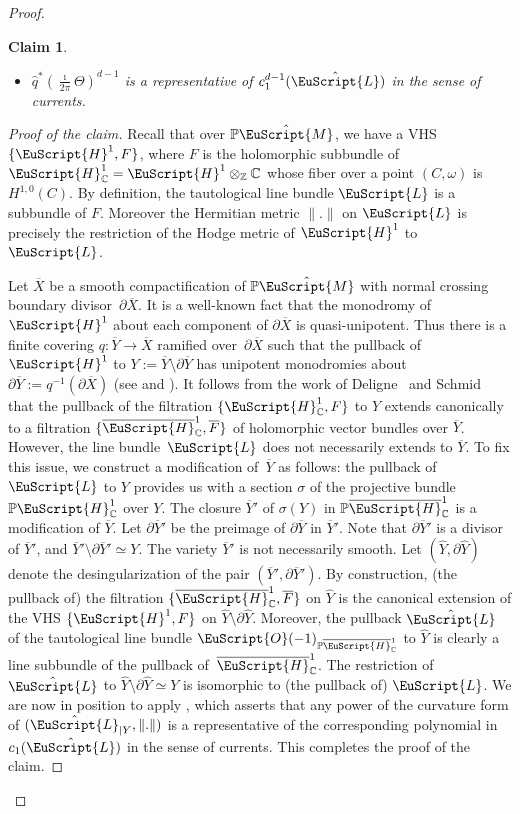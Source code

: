 \documentclass[JEP,XML,SOM,Unicode]{cedram}
\let\mathcal\EuScript
\theoremstyle{plain}
\newtheorem{Claim}[Theorem]{Claim}
\theoremstyle{definition}
\def\C{\mathbb{C}}
\newcommand\Z{\mathbb{Z}}
\newcommand{\Pb}{\mathbb{P}}
\newcommand{\Ocal}{\mathcal{O}}
\newcommand{\cH}{\mathcal{H}}
\newcommand{\cL}{\mathcal{L}}
\newcommand{\cM}{\mathcal{M}}
\let\omg\omega
\let\ol\overline
\begin{document}
\begin{proof}
\begin{Claim}
\begin{itemize}
\item $\hat{q}^*(\frac{\imath}{2\pi}\Theta)^{d-1}$ is a representative of $c^{d-1}_1(\hat{\cL})$ in the sense of currents.
\end{itemize}
\end{Claim}
\begin{proof}[Proof of the claim]
Recall that over $\Pb\hat{\cM}$, we have a VHS $\{\cH^1, F\}$, where $F$ is the holomorphic subbundle of $\cH^1_{\C}=\cH^1\otimes_{\Z}\C$ whose fiber over a point $(C,\omg)$ is $H^{1,0}(C)$. By definition, the tautological line bundle $\cL$ is a subbundle of $F$. Moreover the Hermitian metric $\|.\|$ on $\cL$ is precisely the restriction of the Hodge metric of $\cH^1$ to $\cL$.

Let $\ol{X}$ be a smooth compactification of $\Pb\hat{\cM}$ with normal crossing boundary divi\-sor~$\partial \ol{X}$. It is a well-known fact that the monodromy of $\cH^1$ about each component of $\partial \ol{X}$ is quasi-unipotent. Thus there is a finite covering $q: \ol{Y} \to \ol{X}$ ramified over~$\partial \ol{X}$ such that the pullback of $\cH^1$ to $Y:=\ol{Y}\setminus \partial\ol{Y}$ has unipotent monodromies about $\partial \ol{Y}:=q^{-1}(\partial \ol{X})$ (see \cite[Th.\,17]{Kaw81} and \cite[Lem.\,3.5]{Bru18}). It follows from the work of Deligne~\cite{Del70} and Schmid~\cite{Sch73} that the pullback of the filtration $\{\cH^1_{\C},F\}$ to $Y$ extends canonically to a filtration $\{\ol{\cH}^1_{\C}, \ol{F}\}$ of holomorphic vector bundles over $\ol{Y}$.
However, the line bundle~$\cL$ does not necessarily extends to $\ol{Y}$.
To fix this issue, we construct a modification of~$\ol{Y}$ as follows: the pullback of $\cL$ to $Y$ provides us with a section $\sigma$ of the projective bundle $\Pb\cH^1_{\C}$ over $Y$. The closure $\ol{Y}'$ of $\sigma(Y)$ in $\Pb\ol{\cH}^1_{\C}$ is a modification of $\ol{Y}$. Let $\partial \ol{Y}'$ be the preimage of $\partial \ol{Y}$ in $\ol{Y}'$. Note that $\partial\ol{Y}'$ is a divisor of $\ol{Y}'$, and $\ol{Y}'\setminus\partial\ol{Y}'\simeq Y$. The variety $\ol{Y}'$ is not necessarily smooth. Let $(\hat{Y},\partial\hat{Y})$ denote the desingularization of the pair $(\ol{Y}',\partial \ol{Y}')$. By construction, (the pullback of) the filtration $\{\ol{\cH}^1_{\C}, \ol{F}\}$ on $\hat{Y}$ is the canonical extension of the VHS $\{\cH^1,F\}$ on $\hat{Y}\setminus\partial\hat{Y}$. Moreover, the pullback $\hat{\cL}$ of the tautological line bundle $\Ocal(-1)_{\Pb\ol{\cH}^1_{\C}}$ to $\hat{Y}$ is clearly a line subbundle of the pullback of~$\ol{\cH}^1_{\C}$.
The restriction of $\hat{\cL}$ to $\hat{Y}\setminus\partial\hat{Y}\simeq Y$ is isomorphic to (the pullback of) $\cL$.
We are now in position to apply \cite[Th.\,5.1 and Remark 5.19]{Kollar87}, which asserts that any power of the curvature form of $(\hat{\cL}_{|Y}, \|.\|)$ is a representative of the corresponding polynomial in $c_1(\hat{\cL})$ in the sense of currents. This completes the proof of the claim.
\end{proof}


\end{proof}
\end{document}
